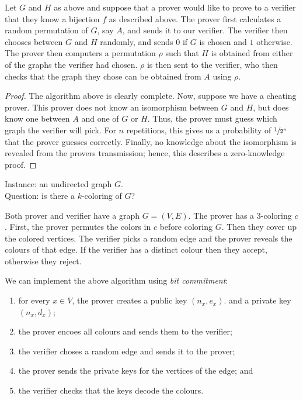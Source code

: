 \begin{algorithm}
	Let $G$ and $H$ as above
	and suppose that a prover would like to prove to a verifier
	that they know a bijection $f$ as described above.
	The prover first calculates a random permutation of $G$, say $A$,
	and sends it to our verifier.
	The verifier then chooses between $G$ and $H$ randomly,
	and sends $0$ if $G$ is chosen and $1$ otherwise.
	The prover then computers a permutation $\rho$ such that $H$ is
	obtained from either of the graphs the verifier had chosen.
	$\rho$ is then sent to the verifier, who then checks that the
	graph they chose can be obtained from $A$ using $\rho$.
\end{algorithm}

\begin{proof}
	The algorithm above is clearly complete.
	Now, suppose we have a cheating prover.
	This prover does not know an isomorphism between $G$ and $H$,
	but does know one between $A$ and one of $G$ or $H$.
	Thus, the prover must guess which graph the verifier will pick.
	For $n$ repetitions, this gives us a probability of $\sfrac{1}{2^n}$
	that the prover guesses correctly.
	Finally, no knowledge about the isomorphism is revealed from the provers
	transmission; hence, this describes a zero-knowledge proof.
\end{proof}

\begin{problem}[3-coloring]
	Instance: an undirected graph $G$. \\
	Question: is there a $k$-coloring of $G$?
\end{problem}

\begin{algorithm}
	Both prover and verifier have a graph $G = (V,E)$.
	The prover has a 3-coloring $c$.
	First, the prover permutes the colors in $c$ before coloring $G$.
	Then they cover up the colored vertices.
	The verifier picks a random edge and the prover reveals the colours of
	that edge.
	If the verifier has a distinct colour then they accept, otherwise
	they reject.
\end{algorithm}

We can implement the above algorithm using \emph{bit commitment}:
\begin{enumerate}
	\item for every $x \in V$, the prover creates a public key $(n_x, e_x)$.
		and a private key $(n_x, d_x)$;

	\item the prover encoes all colours and sends them to the verifier;

	\item the verifier choses a random edge and sends it to the prover;
		
	\item the prover sends the private keys for the vertices of the edge; and

	\item the verifier checks that the keys decode the colours.
\end{enumerate}
